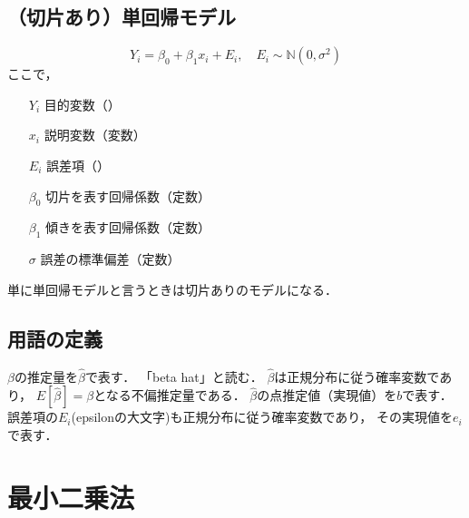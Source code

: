 \subsection{（切片あり）単回帰モデル}

\MyFrame{\insertsubsection}
{
  \[Y_i = \beta_0 + \beta_1 x_i + E_i, \quad E_i \sim \mathbb{N}(0, \sigma^2)\]
  ここで，\\
  \begin{itemize}
    \item [$Y_i$] 目的変数（）
    \item [$x_i$] 説明変数（変数）
    \item [$E_i$] 誤差項（）
    \item [$\beta_0$] 切片を表す回帰係数（定数）
    \item [$\beta_1$] 傾きを表す回帰係数（定数）
    \item [$\sigma$] 誤差の標準偏差（定数）
  \end{itemize}
  \alert{単に単回帰モデルと言うときは切片ありのモデルになる．}
}

\subsection{用語の定義}

\MyFrame{\insertsubsection}
{
  {
    $\beta$の推定量を$\hat{\beta}$で表す．
    「beta hat」と読む．
    $\hat{\beta}$は正規分布に従う確率変数であり，
    $E[\hat{\beta}]=\beta$となる不偏推定量である．
    $\hat{\beta}$の点推定値（実現値）を$b$で表す．
  }
  誤差項の$E_i$(epsilonの大文字)も正規分布に従う確率変数であり，
  その実現値を$e_i$で表す．
}

\section{最小二乗法}

{
  \begin{minipage}{0.3\textwidth}
  \end{minipage}
  \begin{minipage}{0.3\textwidth}
  \end{minipage}
  \begin{minipage}{0.3\textwidth}
  \end{minipage}
  \begin{minipage}{0.3\textwidth}
  \end{minipage}
  \begin{minipage}{0.3\textwidth}
  \end{minipage}
  \begin{minipage}{0.3\textwidth}
  \end{minipage}
}

